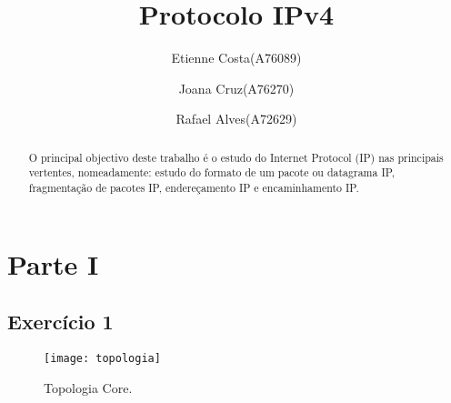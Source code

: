 \documentclass{exam}
\begin{document}
\title{Protocolo IPv4}

\author{Etienne Costa(A76089) \and Joana Cruz(A76270) \and Rafael Alves(A72629)}

\date{}
\maketitle

\begin{abstract}
O principal objectivo deste trabalho é o estudo do Internet Protocol (IP) nas principais vertentes, nomeadamente: estudo do formato de um pacote ou datagrama IP, fragmentação de pacotes IP, endereçamento IP e encaminhamento IP.
\end{abstract}
\section{Parte I}
\subsection{Exercício 1}

\begin{figure}[H]
\centering\texttt{[image: topologia]} 
\caption{\label{fig:controller}Topologia Core.}
\end{figure} 
\end{document}

